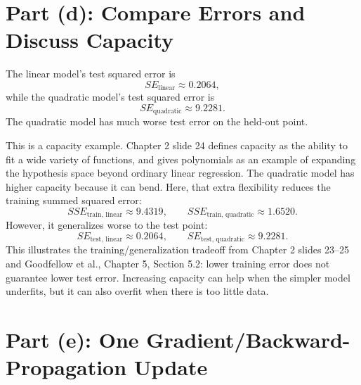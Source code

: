 \documentclass[11pt]{article}
\begin{document}
\section*{Part (d): Compare Errors and Discuss Capacity}

The linear model's test squared error is
\[
SE_{\text{linear}}\approx 0.2064,
\]
while the quadratic model's test squared error is
\[
SE_{\text{quadratic}}\approx 9.2281.
\]
The quadratic model has much worse test error on the held-out point.

This is a capacity example. Chapter 2 slide 24 defines capacity as the ability to fit a wide variety of functions, and gives polynomials as an example of expanding the hypothesis space beyond ordinary linear regression. The quadratic model has higher capacity because it can bend. Here, that extra flexibility reduces the training summed squared error:
\[
SSE_{\text{train, linear}}\approx 9.4319,\qquad
SSE_{\text{train, quadratic}}\approx 1.6520.
\]
However, it generalizes worse to the test point:
\[
SE_{\text{test, linear}}\approx 0.2064,\qquad
SE_{\text{test, quadratic}}\approx 9.2281.
\]
This illustrates the training/generalization tradeoff from Chapter 2 slides 23--25 and Goodfellow et al., Chapter 5, Section 5.2: lower training error does not guarantee lower test error. Increasing capacity can help when the simpler model underfits, but it can also overfit when there is too little data.

\section*{Part (e): One Gradient/Backward-Propagation Update}
\end{document}
